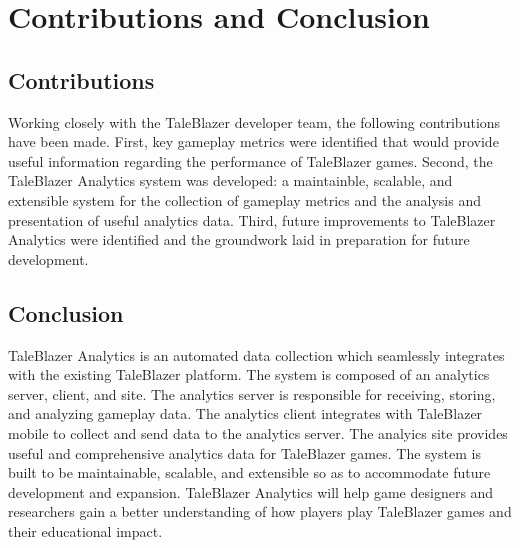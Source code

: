 \chapter{Contributions and Conclusion}

\section{Contributions}

Working closely with the TaleBlazer developer team, the following contributions have been made. First, key gameplay metrics were identified that would provide useful information regarding the performance of TaleBlazer games. Second, the TaleBlazer Analytics system was developed: a maintainble, scalable, and extensible system for the collection of gameplay metrics and the analysis and presentation of useful analytics data. Third, future improvements to TaleBlazer Analytics were identified and the groundwork laid in preparation for future development. 

\section{Conclusion}

TaleBlazer Analytics is an automated data collection which seamlessly integrates with the existing TaleBlazer platform. The system is composed of an analytics server, client, and site. The analytics server is responsible for receiving, storing, and analyzing gameplay data. The analytics client integrates with TaleBlazer mobile to collect and send data to the analytics server. The analyics site provides useful and comprehensive analytics data for TaleBlazer games. The system is built to be maintainable, scalable, and extensible so as to accommodate future development and expansion. TaleBlazer Analytics will help game designers and researchers gain a better understanding of how players play TaleBlazer games and their educational impact.